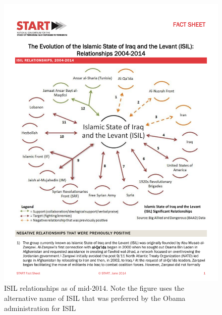 \documentclass{report}
\begin{document}
 \begin{figure}
 \centering
 \includegraphics[trim = 0cm 5.9cm 0cm 5.35cm, clip,scale=0.6]{./figures/ISILRelationships.pdf}
   \caption{ISIL relationships as of mid-2014.  Note the figure uses the alternative name of ISIL that was preferred by the Obama administration for ISIL \cite{NationalConsortiumfortheStudyofTerrorismandResponsestoTerrorism2014}}
     \label{fig:ISILRelationships}
\end{figure}



\end{document}
